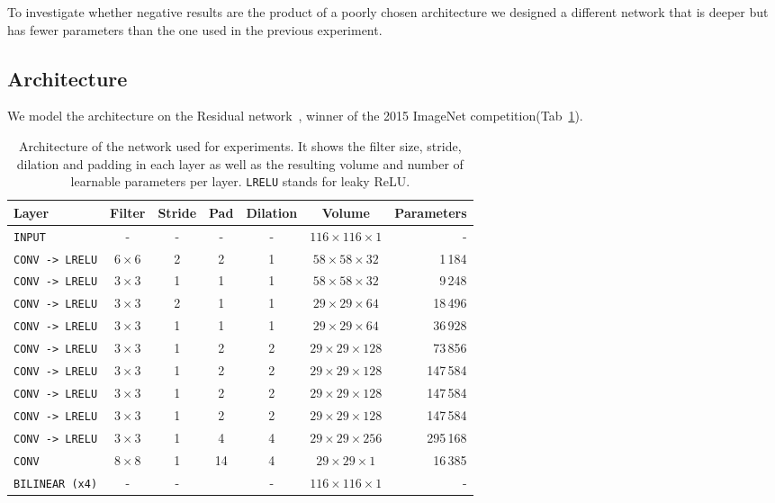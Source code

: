 To investigate whether negative results are the product of a poorly chosen architecture we designed a different network that is deeper but has fewer parameters than the one used in the previous experiment.

\subsection{Architecture}
We model the architecture on the Residual network~\cite{He2015b}, winner of the 2015 ImageNet competition(Tab~\ref{tab:convNetArchitecture3}).
\begin{table}[h]
	\centering
	\begin{tabular}{lcccccr}
	\hline
	\textbf{Layer} & \textbf{Filter} & \textbf{Stride} & \textbf{Pad} & \textbf{Dilation} & \textbf{Volume} & \textbf{Parameters} \\
	\hline
	\texttt{INPUT}	&- & -	& - & - & $116 \times 116 \times 1$ & -\\
	\texttt{CONV -> LRELU}	& $6 \times 6$ & 2 & 2 & 1 & $58 \times 58 \times 32$ & 1\,184\\
	\texttt{CONV -> LRELU}	& $3 \times 3$ & 1 & 1 & 1 & $58 \times 58 \times 32$ & 9\,248\\
	\texttt{CONV -> LRELU}	& $3 \times 3$ & 2 & 1 & 1 & $29 \times 29 \times 64$ & 18\,496\\
	\texttt{CONV -> LRELU}	& $3 \times 3$ & 1 & 1 & 1 & $29 \times 29 \times 64$ & 36\,928\\
	\texttt{CONV -> LRELU}	& $3 \times 3$ & 1 & 2 & 2 & $29 \times 29 \times 128$ & 73\,856\\
	\texttt{CONV -> LRELU}	& $3 \times 3$ & 1 & 2 & 2 & $29 \times 29 \times 128$ & 147\,584\\
	\texttt{CONV -> LRELU}	& $3 \times 3$ & 1 & 2 & 2 & $29 \times 29 \times 128$ & 147\,584\\
	\texttt{CONV -> LRELU}	& $3 \times 3$ & 1 & 2 & 2 & $29 \times 29 \times 128$ & 147\,584\\
	\texttt{CONV -> LRELU}	& $3 \times 3$ & 1 & 4 & 4 & $29 \times 29 \times 256$ & 295\,168\\
	\texttt{CONV}	& $8 \times 8$ & 1 & 14 & 4 & $29 \times 29 \times 1$ & 16\,385\\
	\texttt{BILINEAR (x4)}		& - & - && - & $116 \times 116 \times 1$ & -\\
	\hline
	\end{tabular}
	\caption[Convolutional network architecture for Experiment 3]{Architecture of the network used for experiments. It shows the filter size, stride, dilation and padding in each layer as well as the resulting volume and number of learnable parameters per layer. \texttt{LRELU} stands for leaky ReLU.}
	\label{tab:convNetArchitecture3}
\end{table}

